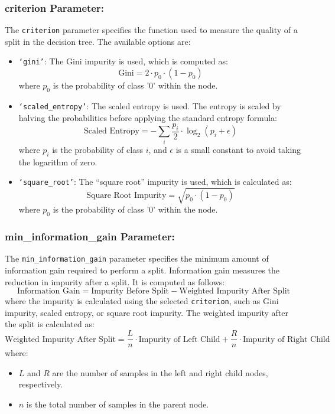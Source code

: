 \documentclass{article}
\begin{document}
\subsubsection*{criterion Parameter:}

The \texttt{criterion} parameter specifies the function used to measure the quality of a split in the decision tree. The available options are:

\begin{itemize}
    \item \texttt{`gini'}: The Gini impurity is used, which is computed as:
    \[
    \text{Gini} = 2 \cdot p_0 \cdot (1 - p_0)
    \]
    where \( p_0 \) is the probability of class '0' within the node.
    
    \item \texttt{`scaled\_entropy'}: The scaled entropy is used. The entropy is scaled by halving the probabilities before applying the standard entropy formula:
    \[
    \text{Scaled Entropy} = -\sum_{i} \frac{p_i}{2} \cdot \log_2(p_i + \epsilon)
    \]
    where \( p_i \) is the probability of class \( i \), and \( \epsilon \) is a small constant to avoid taking the logarithm of zero.
    
    \item \texttt{`square\_root'}: The ``square root'' impurity is used, which is calculated as:
    \[
    \text{Square Root Impurity} = \sqrt{p_0 \cdot (1 - p_0)}
    \]
    where \( p_0 \) is the probability of class '0' within the node.
\end{itemize}

\subsubsection*{min\_information\_gain Parameter:}

The \texttt{min\_information\_gain} parameter specifies the minimum amount of information gain required to perform a split. Information gain measures the reduction in impurity after a split. It is computed as follows:
\[
    \text{Information Gain} = \text{Impurity Before Split} - \text{Weighted Impurity After Split}
\]
where the impurity is calculated using the selected \texttt{criterion}, such as Gini impurity, scaled entropy, or square root impurity. The weighted impurity after the split is calculated as:
\[
    \text{Weighted Impurity After Split} = \frac{L}{n} \cdot \text{Impurity of Left Child} + \frac{R}{n} \cdot \text{Impurity of Right Child}
\]
where:
\begin{itemize}
    \item \( L \) and \( R \) are the number of samples in the left and right child nodes, respectively.
    \item \( n \) is the total number of samples in the parent node.
\end{itemize}
\end{document}
